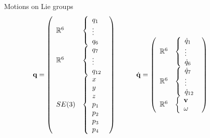 \begin{frame} {Motions on Lie groups}
  $$\textbf{q}=
  \left(
  \begin{array}{ll}
    \mathbb{R}^6 &\left\{\begin{array}{l}q_1 \\ \vdots \\ q_6 \end{array}\right.\\
    \mathbb{R}^6 &\left\{\begin{array}{l} q_7 \\ \vdots \\ q_{12} \end{array}\right.\\
    SE(3)  &\left\{\begin{array}{l} x \\ y \\ z \\ p_1 \\ p_2 \\ p_3 \\ p_4\end{array}\right.
  \end{array}\right) \hspace*{1cm}
  \dot{\mathbf{q}}=
  \left(
  \begin{array}{ll}
    \mathbb{R}^6 &\left\{\begin{array}{l}\dot{q}_1 \\ \vdots \\ \dot{q}_6 \end{array}\right.\\
    \mathbb{R}^6 &\left\{\begin{array}{l} \dot{q}_7 \\ \vdots \\ \dot{q}_{12} \end{array}\right.\\
    \mathbb{R}^6 &\left\{\begin{array}{l} \mathbf{v}\\ \omega \end{array}\right.
  \end{array}\right) \hspace*{1cm}
  $$
\end{frame}

